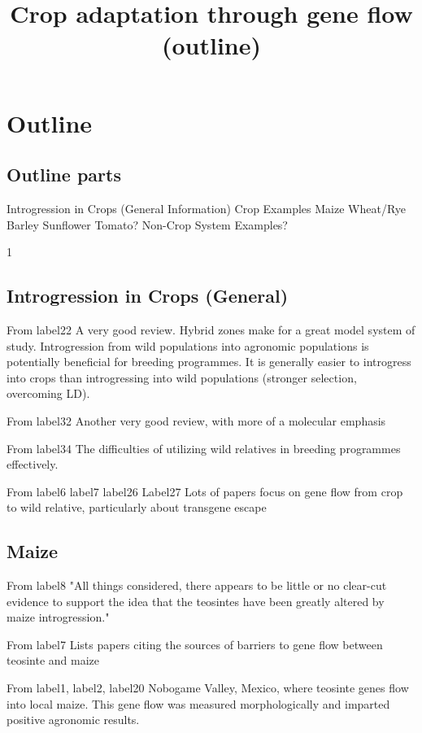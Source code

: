 \documentclass[11pt]{article}
\title{Crop adaptation through gene flow (outline)}
\begin{document}
\maketitle

\section*{Outline}
\subsection*{Outline parts}
Introgression in Crops (General Information)
Crop Examples
    Maize
    Wheat/Rye
    Barley
    Sunflower
    Tomato?
Non-Crop System Examples?

1\subsection*{Introgression in Crops (General)}

From {label22}
A very good review.
Hybrid zones make for a great model system of study.
Introgression from wild populations into agronomic populations is potentially beneficial for breeding programmes.
It is generally easier to introgress into crops than introgressing into wild populations (stronger selection, overcoming LD).

From {label32}
Another very good review, with more of a molecular emphasis

From {label34}
The difficulties of utilizing wild relatives in breeding programmes effectively.

From {label6} {label7} {label26} {Label27}
Lots of papers focus on gene flow from crop to wild relative, particularly about transgene escape

\subsection*{Maize}

From {label8}
"All things considered, there appears to be little or no clear-cut evidence to support the idea that the teosintes have been greatly altered by maize introgression."

From {label7}
Lists papers citing the sources of barriers to gene flow between teosinte and maize

From {label1}, {label2}, {label20}
Nobogame Valley, Mexico, where teosinte genes flow into local maize.  This gene flow was measured morphologically and imparted positive agronomic results.
\end{document}
